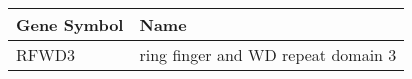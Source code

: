 \begin{tabular}{ll}
\toprule
Gene Symbol &                               Name \\
\midrule
      RFWD3 & ring finger and WD repeat domain 3 \\
\bottomrule
\end{tabular}
